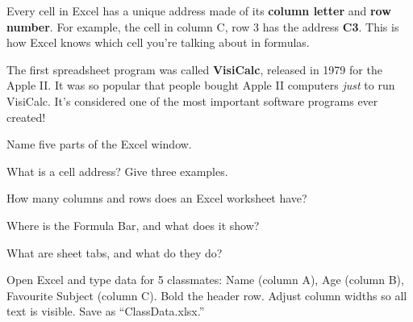 \begin{theorybox}
Every cell in Excel has a unique address made of its \textbf{column letter} and \textbf{row number}. For example, the cell in column C, row 3 has the address \textbf{C3}. This is how Excel knows which cell you're talking about in formulas.
\end{theorybox}


\begin{funfact}
The first spreadsheet program was called \textbf{VisiCalc}, released in 1979 for the Apple II. It was so popular that people bought Apple II computers \emph{just} to run VisiCalc. It's considered one of the most important software programs ever created!
\end{funfact}

\begin{reviewqs}
  \item Name five parts of the Excel window.
  \item What is a cell address? Give three examples.
  \item How many columns and rows does an Excel worksheet have?
  \item Where is the Formula Bar, and what does it show?
  \item What are sheet tabs, and what do they do?
\end{reviewqs}

\begin{challenge}
Open Excel and type data for 5 classmates: Name (column A), Age (column B), Favourite Subject (column C). Bold the header row. Adjust column widths so all text is visible. Save as ``ClassData.xlsx.''
\end{challenge}
